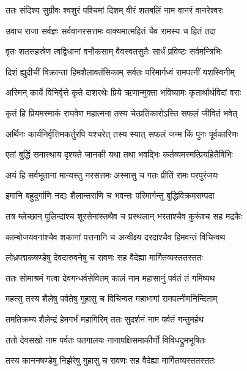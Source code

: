 
\twolineshloka
{ततः संदिश्य सुग्रीवः श्वशुरं पश्चिमां दिशम्}
{वीरं शतबलिं नाम वानरं वानरेश्वरः} %

\twolineshloka
{उवाच राजा सर्वज्ञः सर्ववानरसत्तमः}
{वाक्यमात्महितं चैव रामस्य च हितं तदा} %

\twolineshloka
{वृतः शतसहस्रेण त्वद्विधानां वनौकसाम्}
{वैवस्वतसुतैः सार्धं प्रविष्टः सर्वमन्त्रिभिः} %

\twolineshloka
{दिशं ह्युदीचीं विक्रान्तां हिमशैलावतंसिकाम्}
{सर्वतः परिमार्गध्वं रामपत्नीं यशस्विनीम्} %

\twolineshloka
{अस्मिन् कार्ये विनिर्वृत्ते कृते दाशरथेः प्रिये}
{ऋणान्मुक्ता भविष्यामः कृतार्थार्थविदां वराः} %

\twolineshloka
{कृतं हि प्रियमस्माकं राघवेण महात्मना}
{तस्य चेत्प्रतिकारोऽस्ति सफलं जीवितं भवेत्} %

\twolineshloka
{अर्थिनः कार्यनिर्वृत्तिमकर्तुरपि यश्चरेत्}
{तस्य स्यात् सफलं जन्म किं पुनः पूर्वकारिणः} %

\twolineshloka
{एतां बुद्धिं समास्थाय दृश्यते जानकी यथा}
{तथा भवद्भिः कर्तव्यमस्मत्प्रियहितैषिभिः} %

\twolineshloka
{अयं हि सर्वभूतानां मान्यस्तु नरसत्तमः}
{अस्मासु च गतः प्रीतिं रामः परपुरंजयः} %

\twolineshloka
{इमानि बहुदुर्गाणि नद्यः शैलान्तराणि च}
{भवन्तः परिमार्गन्तु बुद्धिविक्रमसम्पदा} %

\twolineshloka
{तत्र म्लेच्छान् पुलिन्दांश्च शूरसेनांस्तथैव च}
{प्रस्थलान् भरतांश्चैव कुरूंश्च सह मद्रकैः} %

\twolineshloka
{काम्बोजयवनांश्चैव शकानां पत्तनानि च}
{अन्वीक्ष्य दरदांश्चैव हिमवन्तं विचिन्वथ} %

\twolineshloka
{लोध्रपद्मकषण्डेषु देवदारुवनेषु च}
{रावणः सह वैदेह्या मार्गितव्यस्ततस्ततः} %

\twolineshloka
{ततः सोमाश्रमं गत्वा देवगन्धर्वसेवितम्}
{कालं नाम महासानुं पर्वतं तं गमिष्यथ} %

\twolineshloka
{महत्सु तस्य शैलेषु पर्वतेषु गुहासु च}
{विचिन्वत महाभागां रामपत्नीमनिन्दिताम्} %

\twolineshloka
{तमतिक्रम्य शैलेन्द्रं हेमगर्भं महागिरिम्}
{ततः सुदर्शनं नाम पर्वतं गन्तुमर्हथ} %

\twolineshloka
{ततो देवसखो नाम पर्वतः पतगालयः}
{नानापक्षिसमाकीर्णो विविधद्रुमभूषितः} %

\twolineshloka
{तस्य काननषण्डेषु निर्झरेषु गुहासु च}
{रावणः सह वैदेह्या मार्गितव्यस्ततस्ततः} %

